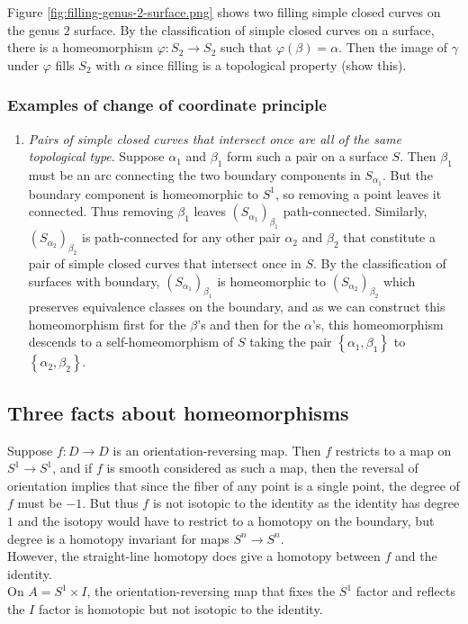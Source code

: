 \documentclass[reqno]{amsart}
\theoremstyle{definition}
\theoremstyle{remark}
\begin{document}
Figure \ref{fig:filling-genus-2-surface.png} shows
two filling simple closed curves on the genus $2$ surface.
By the classification of simple closed curves on a surface,
there is a homeomorphism $\varphi \colon S_2 \to S_2$ such
that $\varphi\left( \beta \right) =\alpha$. Then
the image of $\gamma$ under $\varphi$ fills $S_2$ with
$\alpha$ since filling is a topological property (show this).

\subsubsection*{Examples of change of coordinate principle}

\begin{enumerate}
    \item \textit{Pairs of simple closed curves that intersect
        once are all of the same topological type}.
        Suppose $\alpha_1$ and $\beta_1$ form
        such a pair on a surface $S$. Then
        $\beta_1$ must be an arc connecting the two
        boundary components in $S_{\alpha_1}$. But the boundary
        component is homeomorphic to $S^{1}$, so removing a 
        point leaves it connected. Thus removing
        $\beta_1$ leaves $\left( S_{\alpha_1} \right)_{\beta_1}$
        path-connected. Similarly,
        $\left( S_{\alpha_2} \right)_{\beta_2}$ is path-connected
        for any other pair $\alpha_2$ and $\beta_2$ that
        constitute a pair of simple closed curves
        that intersect once in $S$. By the classification
        of surfaces with boundary, $\left( S_{\alpha_1} \right)_{\beta_1}$ is
        homeomorphic to $\left( S_{\alpha_2} \right)_{\beta_2}$ 
        which preserves equivalence classes on the boundary,
        and as we can construct this homeomorphism first
        for the $\beta$'s and then for the $\alpha$'s, 
        this homeomorphism descends to a self-homeomorphism
        of $S$ taking the pair $\left\{ \alpha_1, \beta_1 \right\} $ 
        to $\left\{ \alpha_2, \beta_2 \right\} $.
\end{enumerate}


\subsection*{Three facts about homeomorphisms}

Suppose $f \colon D \to D$ is an orientation-reversing map.
Then $f$ restricts to a map on $S^{1} \to S^{1}$, and
if $f$ is smooth considered as such a map, then the
reversal of orientation implies that since the fiber
of any point is a single point, the degree of $f$ 
must be $-1$. But thus $f$ is not isotopic to the identity
as the identity has degree $1$ and the isotopy would
have to restrict to a homotopy on the boundary, but
degree is a homotopy invariant for maps $S^{n} \to S^{n}$.\\
However, the straight-line homotopy does give a homotopy
between $f$ and the identity.\\
\linebreak
On $A = S^{1} \times I$, the orientation-reversing map
that fixes the $S^{1}$ factor and reflects the $I$ factor
is homotopic but not isotopic to the identity.
\end{document}
